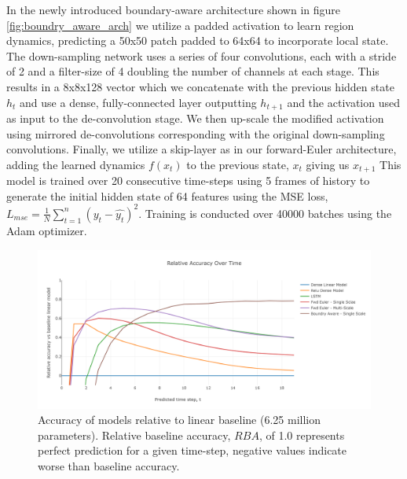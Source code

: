 \documentclass[12pt]{article}
\theoremstyle{plain}
\theoremstyle{remark}
\theoremstyle{definition}
\begin{document}
In the newly introduced boundary-aware architecture shown in figure \ref{fig:boundry_aware_arch} we utilize a padded activation to learn region dynamics, predicting a 50x50 patch padded to 64x64 to incorporate local state. The down-sampling network uses a series of four convolutions, each with a stride of 2 and a filter-size of 4 doubling the number of channels at each stage. This results in a 8x8x128 vector which we concatenate with the previous hidden state $h_{t}$ and use a dense, fully-connected layer outputting $h_{t+1}$ and the activation used as input to the de-convolution stage. We then up-scale the modified activation using mirrored de-convolutions corresponding with the original down-sampling convolutions. Finally, we utilize a skip-layer as in our forward-Euler architecture, adding the learned dynamics $f(x_t)$ to the previous state, $x_t$ giving us $x_{t+1}$ This model is trained over 20 consecutive time-steps using 5 frames of history to generate the initial hidden state of 64 features using the MSE loss, $L_{mse} = \frac{1}{N}\sum_{t=1}^{n}(y_t - \hat{y_t})^2$. Training is conducted over 40000 batches using the Adam optimizer.


\begin{figure}
	\centering
	\includegraphics[width=0.95\linewidth]{relative_perf_boundry_aware}
	\caption{\small Accuracy of models relative to linear baseline (6.25 million parameters). Relative baseline accuracy, $RBA$, of 1.0 represents perfect prediction for a given time-step, negative values indicate worse than baseline accuracy.}
	\label{fig:abs_perf_new}
\end{figure}
\end{document}
